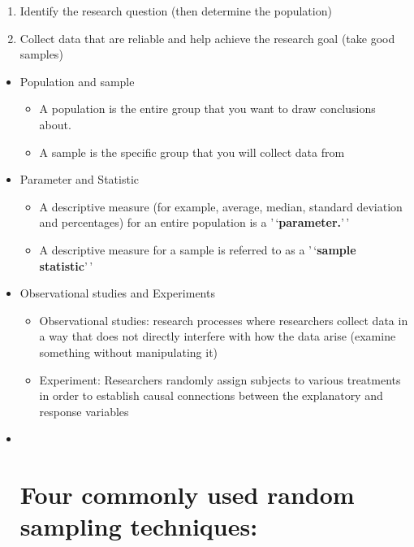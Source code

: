 \documentclass[
]{book}
\providecommand{\tightlist}{%
  \setlength{\itemsep}{0pt}\setlength{\parskip}{0pt}}
\begin{document}
\begin{enumerate}
\def\labelenumi{\arabic{enumi})}
\item
  Identify the research question (then determine the population)
\item
  Collect data that are reliable and help achieve the research goal (take good samples)
\end{enumerate}

\begin{itemize}
\item
  Population and sample

  \begin{itemize}
  \tightlist
  \item
    A population is the entire group that you want to draw conclusions about.
  \item
    A sample is the specific group that you will collect data from
  \end{itemize}
\item
  Parameter and Statistic

  \begin{itemize}
  \tightlist
  \item
    A descriptive measure (for example, average, median, standard deviation and percentages) for an entire population is a '\,`\textbf{parameter.}'\,'
  \item
    A descriptive measure for a sample is referred to as a '\,`\textbf{sample statistic}'\,'
  \end{itemize}
\item
  Observational studies and Experiments

  \begin{itemize}
  \tightlist
  \item
    Observational studies: research processes where researchers collect data in a way that does not directly interfere with how the data arise (examine something without manipulating it)
  \item
    Experiment: Researchers randomly assign subjects to various treatments in order to establish causal connections between the explanatory and response variables
  \end{itemize}
\item ~
  \section{Four commonly used random sampling techniques:}\label{four-commonly-used-random-sampling-techniques}


\end{itemize}
\end{document}
